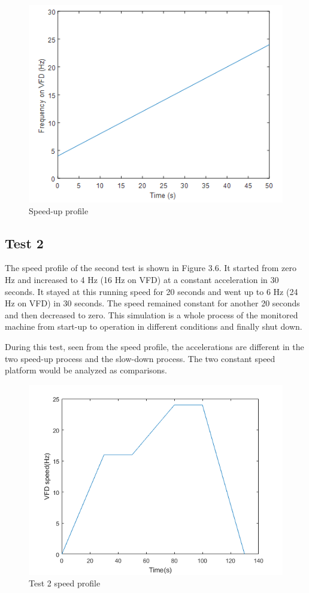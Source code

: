 \begin{figure}[h]
	\centering
	\includegraphics{speedup}
	\caption{Speed-up profile}
	\label{test1}
\end{figure}

\subsection{Test 2}

The speed profile of the second test is shown in Figure 3.6. It started from zero Hz and increased to 4 Hz (16 Hz on VFD) at a constant acceleration in 30 seconds. It stayed at this running speed for 20 seconds and went up to 6 Hz (24 Hz on VFD) in 30 seconds. The speed remained constant for another 20 seconds and then decreased to zero. This simulation is a whole process of the monitored machine from start-up to operation in different conditions and finally shut down.

During this test, seen from the speed profile, the accelerations are different in the two speed-up process and the slow-down process. The two constant speed platform would be analyzed as comparisons.

\begin{figure}[h]
	\centering
	\includegraphics[scale = 0.85]{test2}
	\caption{Test 2 speed profile}
	\label{test2}
\end{figure}

